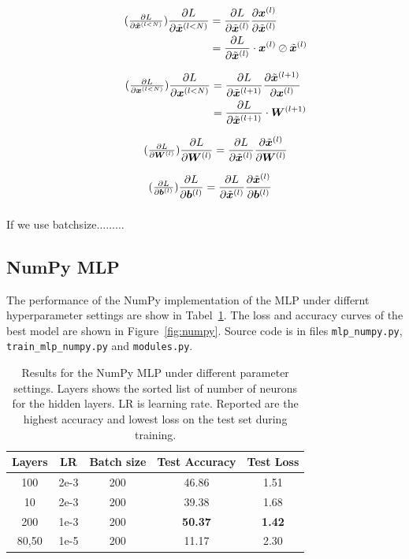 \documentclass{article}
\newcommand\·{\ensuremath{\cdot}}
\newcommand\…{\ensuremath{\dots}}
\newcommand{\⇔}{\ensuremath{\Leftrightarrow}}
\newcommand{\⇐}{\ensuremath{\Rightarrow}}
\newcommand{\⇒}{\ensuremath{\Leftarrow}}
\newcommand\pf[2]{\ensuremath{\frac{\partial {#1}}{\partial {#2}}}}
\newcommand*{\B}[1]{\ifmmode\bm{#1}\else\textbf{#1}\fi}
\newcommand\1{\ensuremath{\mathds{1}}}
\newcommand\ℝ{\ensuremath{\mathds{R}}}
\begin{document}
\begin{align*}
  \tag{$\pf{L}{\tilde{\B{x}}^{(l<N)}}$}
  \pf{L}{\tilde{\B{x}}^{(l<N)}}
  &= \pf{L}{\tilde{\B{x}}^{(l)}}\pf{\B{x}^{(l)}}{\tilde{\B{x}}^{(l)}}\\
  &= \pf{L}{\tilde{\B{x}}^{(l)}}\·\B{x}^{(l)}\oslash\tilde{\B{x}}^{(l)}
\end{align*}

\begin{align*}
  \tag{$\pf{L}{\B{x}^{(l<N)}}$}
  \pf{L}{\B{x}^{(l<N)}}
  &= \pf{L}{\tilde{\B{x}}^{(l+1)}}\pf{\tilde{\B{x}}^{(l+1)}}{\B{x}^{(l)}}\\
  &= \pf{L}{\tilde{\B{x}}^{(l+1)}}\·\B{W}^{(l+1)}\\
\end{align*}

\begin{align*}
  \tag{$\pf{L}{\B{W}^{(l)}}$}
  \pf{L}{\B{W}^{(l)}}
  &= \pf{L}{\tilde{\B{x}}^{(l)}}\pf{\tilde{\B{x}}^{(l)}}{\B{W}^{(l)}}\\
\end{align*}

\begin{align*}
  \tag{$\pf{L}{\B{b}^{(l)}}$}
  \pf{L}{\B{b}^{(l)}}
  &= \pf{L}{\tilde{\B{x}}^{(l)}}\pf{\tilde{\B{x}}^{(l)}}{\B{b}^{(l)}}
\end{align*}

\subsubsection{}
If we use batchsize\…\…\…

\subsection{NumPy MLP}
The performance of the NumPy implementation of the MLP under differnt hyperparameter settings are show in Tabel~\ref{tab:numpy}.
The loss and accuracy curves of the best model are shown in Figure~\ref{fig:numpy}.
Source code is in files \texttt{mlp\_numpy.py}, \texttt{train\_mlp\_numpy.py} and \texttt{modules.py}.

\begin{table}
  \centering
  \begin{tabular}{ccccc}
    Layers & LR & Batch size & Test Accuracy & Test Loss\\\toprule
    100 & 2e-3 & 200 & 46.86 & 1.51\\
    10 & 2e-3 & 200 & 39.38 & 1.68\\
    200 & 1e-3 & 200 & \textbf{50.37} & \textbf{1.42}\\
    80,50 & 1e-5 & 200 & 11.17 & 2.30\\
  \end{tabular}
  \caption{Results for the NumPy MLP under different parameter settings. Layers shows the sorted list of number of neurons for the hidden layers. LR is learning rate. Reported are the highest accuracy and lowest loss on the test set during training.}
  \label{tab:numpy}
\end{table}
\end{document}
